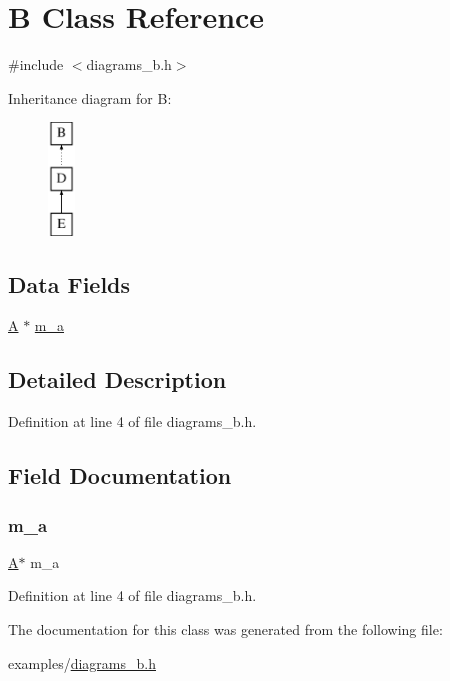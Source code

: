 \hypertarget{class_b}{}\section{B Class Reference}
\label{class_b}


{\ttfamily \#include $<$diagrams\+\_\+b.\+h$>$}

Inheritance diagram for B\+:\begin{figure}[H]
\begin{center}
\leavevmode
\includegraphics[height=3.000000cm]{class_b}
\end{center}
\end{figure}
\subsection*{Data Fields}
\begin{DoxyCompactItemize}
\item 
\hyperlink{class_a}{A} $\ast$ \hyperlink{class_b_addc7d54200781ba60c58a63744812259}{m\+\_\+a}
\end{DoxyCompactItemize}


\subsection{Detailed Description}


Definition at line 4 of file diagrams\+\_\+b.\+h.



\subsection{Field Documentation}
\mbox{\label{class_b_addc7d54200781ba60c58a63744812259}} 
\subsubsection{\texorpdfstring{m\+\_\+a}{m\_a}}
{\footnotesize\ttfamily \hyperlink{class_a}{A}$\ast$ m\+\_\+a}



Definition at line 4 of file diagrams\+\_\+b.\+h.



The documentation for this class was generated from the following file\+:\begin{DoxyCompactItemize}
\item 
examples/\hyperlink{diagrams__b_8h}{diagrams\+\_\+b.\+h}\end{DoxyCompactItemize}
